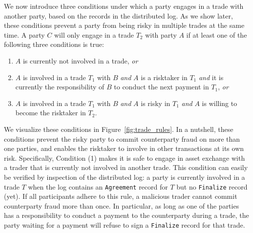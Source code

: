 We now introduce three conditions under which a party engages in a trade with another party, based on the records in the distributed log.
As we show later, these conditions prevent a party from being risky in multiple trades at the same time.
A party $ C $ will only engage in a trade $ T_2 $ with party $ A $ if at least one of the following three conditions is true:
\begin{enumerate}
	\item $ A $ is currently not involved in a trade, \emph{or}
	\item $ A $ is involved in a trade $ T_1 $ with $ B $ \emph{and} $ A $ is a risktaker in $ T_1 $ \emph{and} it is currently the responsibility of $ B $ to conduct the next payment in $ T_1 $, \emph{or}
	\item $ A $ is involved in a trade $ T_1 $ with $ B $ \emph{and} $ A $ is risky in $ T_1 $ \emph{and} $ A $ is willing to become the risktaker in $ T_2 $.
\end{enumerate}

We visualize these conditions in Figure~\ref{fig:trade_rules}. 
In a nutshell, these conditions prevent the risky party to commit counterparty fraud on more than one parties, and enables the risktaker to involve in other transactions at its own risk.
Specifically, Condition (1) makes it is safe to engage in asset exchange with a trader that is currently not involved in another trade.
This condition can easily be verified by inspection of the distributed log: a party is currently involved in a trade $ T $ when the log contains an \texttt{Agreement} record for $ T $ but no \texttt{Finalize} record (yet).
If all \ModelName{} participants adhere to this rule, a malicious trader cannot commit counterparty fraud more than once.
In particular, as long as one of the parties has a responsibility to conduct a payment to the counterparty during a trade, the party waiting for a payment will refuse to sign a \texttt{Finalize} record for that trade.

